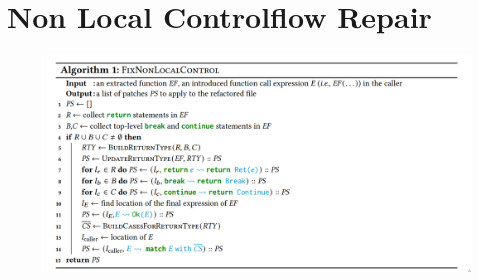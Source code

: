 \section{Non Local Controlflow Repair \cite{AdventureOfALifetime}}
\label{app:non_local_control_flow_repair}


\begin{figure}[h]
    \centering
    \includegraphics[width=\textwidth]{figures/algo_1.png}
    \label{fig:algo_1}
\end{figure}